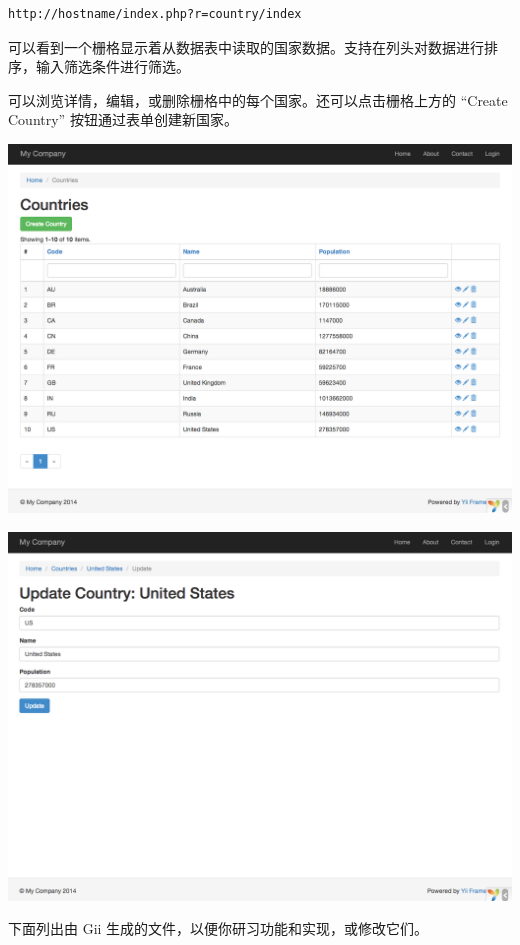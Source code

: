 \begin{lstlisting}
http://hostname/index.php?r=country/index
\end{lstlisting}
可以看到一个栅格显示着从数据表中读取的国家数据。支持在列头对数据进行排序，输入筛选条件进行筛选。

可以浏览详情，编辑，或删除栅格中的每个国家。还可以点击栅格上方的 “Create Country” 按钮通过表单创建新国家。

\noindent\includegraphics[width=\textwidth]{images/start-gii-country-grid.png}

\noindent\includegraphics[width=\textwidth]{images/start-gii-country-update.png}

下面列出由 Gii 生成的文件，以便你研习功能和实现，或修改它们。

